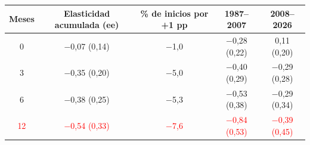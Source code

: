 \begin{tabular}{ccccc}
\toprule
Meses & Elasticidad acumulada (ee) & \% de inicios por +1 pp & 1987--2007 & 2008--2026
\\ \midrule
0 & \ensuremath{-}0{,}07 (0{,}14) & \ensuremath{-}1{,}0 & \ensuremath{-}0{,}28 (0{,}22) & 0{,}11 (0{,}20) \\
3 & \ensuremath{-}0{,}35 (0{,}20) & \ensuremath{-}5{,}0 & \ensuremath{-}0{,}40 (0{,}29) & \ensuremath{-}0{,}29 (0{,}28) \\
6 & \ensuremath{-}0{,}38 (0{,}25) & \ensuremath{-}5{,}3 & \ensuremath{-}0{,}53 (0{,}38) & \ensuremath{-}0{,}29 (0{,}34) \\
\textcolor{red}{12} & \textcolor{red}{\ensuremath{-}0{,}54 (0{,}33)} & \textcolor{red}{\ensuremath{-}7{,}6} & \textcolor{red}{\ensuremath{-}0{,}84 (0{,}53)} & \textcolor{red}{\ensuremath{-}0{,}39 (0{,}45)} \\
\bottomrule
\end{tabular}
